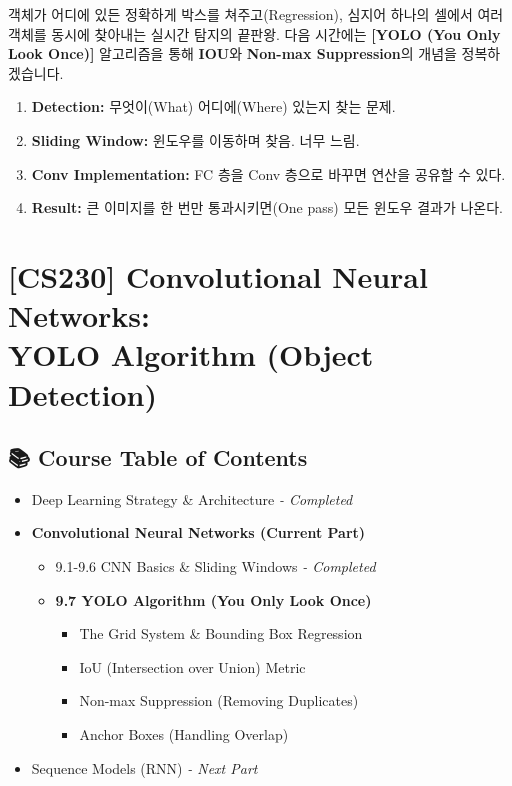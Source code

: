 \documentclass[11pt,a4paper]{book}
\theoremstyle{definition}
\begin{document}
객체가 어디에 있든 정확하게 박스를 쳐주고(Regression), 심지어 하나의 셀에서 여러 객체를 동시에 찾아내는 실시간 탐지의 끝판왕.
다음 시간에는 \textbf{[YOLO (You Only Look Once)]} 알고리즘을 통해 \textbf{IOU}와 \textbf{Non-max Suppression}의 개념을 정복하겠습니다.

\vspace{0.5cm}

\begin{summarybox}[title={단원 요약 (Cheat Sheet)}]
\begin{enumerate}
    \item \textbf{Detection:} 무엇이(What) 어디에(Where) 있는지 찾는 문제.
    \item \textbf{Sliding Window:} 윈도우를 이동하며 찾음. 너무 느림.
    \item \textbf{Conv Implementation:} FC 층을 Conv 층으로 바꾸면 연산을 공유할 수 있다.
    \item \textbf{Result:} 큰 이미지를 한 번만 통과시키면(One pass) 모든 윈도우 결과가 나온다.
\end{enumerate}
\end{summarybox}


\chapter{[CS230] Convolutional Neural Networks: \\ YOLO Algorithm (Object Detection)}
\label{ch:lecture35}

\section*{📚 Course Table of Contents}
\begin{itemize}
    \item[Chapter 1-8.] Deep Learning Strategy \& Architecture \textit{- Completed}
    \item[\textbf{Chapter 9.}] \textbf{Convolutional Neural Networks (Current Part)}
    \begin{itemize}
        \item 9.1-9.6 CNN Basics \& Sliding Windows \textit{- Completed}
        \item \textbf{9.7 YOLO Algorithm (You Only Look Once)}
        \begin{itemize}
            \item The Grid System \& Bounding Box Regression
            \item IoU (Intersection over Union) Metric
            \item Non-max Suppression (Removing Duplicates)
            \item Anchor Boxes (Handling Overlap)
        \end{itemize}
    \end{itemize}
    \item[Chapter 10.] Sequence Models (RNN) \textit{- Next Part}
\end{itemize}
\end{document}
